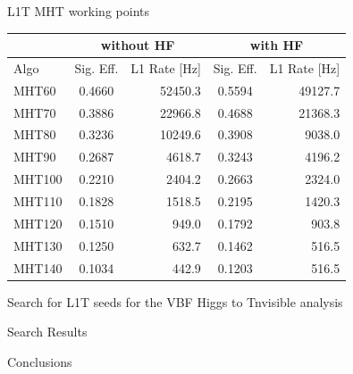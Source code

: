 \documentclass[8pt]{beamer}
\begin{document}
\begin{frame}{L1T MHT working points}

\begin{tabular}{|l|c|r||c|r|}
\hline
     & \multicolumn{2}{c||}{without HF} & \multicolumn{2}{c|}{with HF} \\
\hline \hline
Algo & Sig. Eff. & L1 Rate [Hz] & Sig. Eff. & L1 Rate [Hz] \\
\hline \hline
 MHT60 & 0.4660 & 52450.3 & 0.5594 & 49127.7 \\
 MHT70 & 0.3886 & 22966.8 & 0.4688 & 21368.3 \\
 MHT80 & 0.3236 & 10249.6 & 0.3908 &  9038.0 \\
 MHT90 & 0.2687 &  4618.7 & 0.3243 &  4196.2 \\
MHT100 & 0.2210 &  2404.2 & 0.2663 &  2324.0 \\
MHT110 & 0.1828 &  1518.5 & 0.2195 &  1420.3 \\
MHT120 & 0.1510 &   949.0 & 0.1792 &   903.8 \\
MHT130 & 0.1250 &   632.7 & 0.1462 &   516.5 \\
MHT140 & 0.1034 &   442.9 & 0.1203 &   516.5 \\
\hline
\end{tabular}

\end{frame}

\begin{frame}{Search for L1T seeds for the VBF Higgs to Tnvisible analysis}
 
\end{frame}

\begin{frame}{Search Results}
 
\end{frame}

\begin{frame}{Conclusions}
 
\end{frame}
\end{document}
